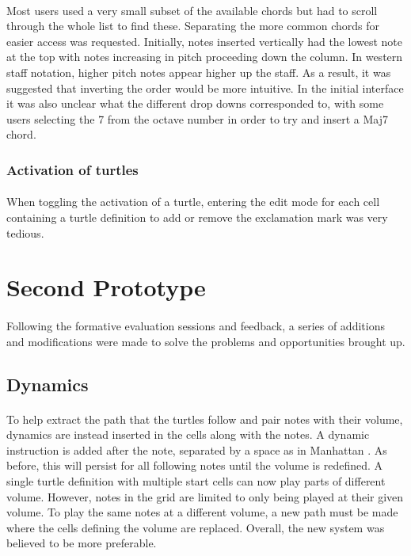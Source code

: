 \paragraph{} Most users used a very small subset of the available chords but had to scroll through the whole list to find these. Separating the more common chords for easier access was requested. Initially, notes inserted vertically  had the lowest note at the top with notes increasing in pitch proceeding down the column. In western staff notation, higher pitch notes appear higher up the staff. As a result, it was suggested that inverting the order would be more intuitive. In the initial interface it was also unclear what the different drop downs corresponded to, with some users selecting the 7 from the octave number in order to try and insert a Maj7 chord.

\subsubsection{Activation of turtles}

\paragraph{} When toggling the activation of a turtle, entering the edit mode for each cell containing a turtle definition to add or remove the exclamation mark was very tedious.

\section{Second Prototype}

\paragraph{} Following the formative evaluation sessions and feedback, a series of additions and modifications were made to solve the problems and opportunities brought up.

\subsection{Dynamics}

\paragraph{} To help extract the path that the turtles follow and pair notes with their volume, dynamics are instead inserted in the cells along with the notes. A dynamic instruction is added after the note, separated by a space as in Manhattan \cite{nash:manhattan}. As before, this will persist for all following notes until the volume is redefined. A single turtle definition with multiple start cells can now play parts of different volume. However, notes in the grid are limited to only being played at their given volume. To play the same notes at a different volume, a new path must be made where the cells defining the volume are replaced. Overall, the new system was believed to be more preferable.

